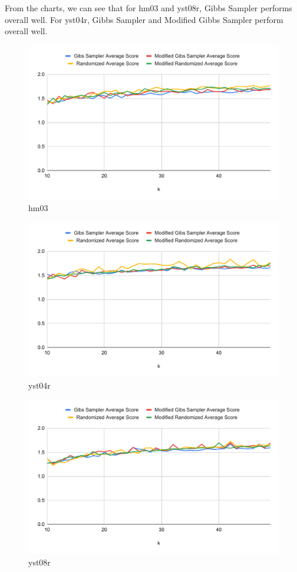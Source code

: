 \documentclass{article}
\begin{document}
From the charts, we can see that for hm03 and yst08r, Gibbs Sampler performs overall well. For yst04r, Gibbs Sampler and Modified Gibbs Sampler perform overall well.
\begin{figure}[!hptb]
    \centering
    \includegraphics[scale=0.7]{Figs/chart_hm03.pdf}
    \caption{hm03}    
\end{figure}
\begin{figure}[!hptb]
    \centering
    \includegraphics[scale=0.7]{Figs/chart_yst04r.pdf}
    \caption{yst04r}    
\end{figure}
\begin{figure}[!hptb]
    \centering
    \includegraphics[scale=0.7]{Figs/chart_yst08r.pdf}
    \caption{yst08r}    
\end{figure}
\clearpage
\end{document}
